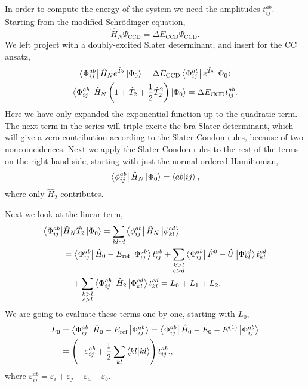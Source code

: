 In order to compute the energy of the system we need the amplitudes $t^{ab}_{ij}$.
Starting from the modified Schrödinger equation,
\begin{equation}
    \hat{H}_N \Psi_{\text{CCD}} = \Delta E_{\text{CCD}} \Psi_{\text{CCD}}.
\end{equation}
We left project with a doubly-excited Slater determinant, and insert for the CC ansatz,
\begin{gather}
    \bra{\Phi^{ab}_{ij}} \hat{H}_N e^{\hat{T}_2} \ket{\Phi_0} 
        = \Delta E_{\text{CCD}} \bra{\Phi^{ab}_{ij}} e^{\hat{T}_2} \ket{\Phi_0} \\
    \bra{\Phi^{ab}_{ij}} 
        \hat{H}_N \left(1 + \hat{T}_2 + \frac{1}{2}\hat{T}^2_2\right) \ket{\Phi_0}
        = \Delta E_{\text{CCD}} t^{ab}_{ij}. \label{eq:ccd_amplitude}
\end{gather}
Here we have only expanded the exponential function up to the quadratic term. The next
term in the series will triple-excite the bra Slater determinant, which will give a
zero-contribution according to the Slater-Condon rules, because of two noncoincidences. Next we apply the Slater-Condon rules to the rest of the terms on the right-hand side, starting with just the normal-ordered Hamiltonian,
\begin{equation}
    \bra{\phi^{ab}_{ij}} \hat{H}_N \ket{\Phi_0} = \bra{ab} \ket{ij},
\end{equation}
where only $\hat{H}_2$ contributes.

Next we look at the linear term,
\begin{equation}
    \begin{aligned}
    \bra{\Phi^{ab}_{ij}} &\hat{H}_N \hat{T}_2 \ket{\Phi_0} 
        = \sum_{klcd} \bra{\phi^{ab}_{ij}} \hat{H}_N \ket{\phi^{cd}_{kl}} \\
    &= \bra{\Phi^{ab}_{ij}} \hat{H}_0 - E_{\text{ref}} \ket{\Phi^{ab}_{ij}}t^{ab}_{ij}
        + \sum_{\substack{k>l \\ c>d}} 
            \bra{\Phi^{ab}_{ij}} \hat{F}^0 - \hat{U} \ket{\Phi^{cd}_{kl}} t^{cd}_{kl} \\
    &\quad + \sum_{\substack{k>l \\ c>l}} 
        \bra{\Phi^{ab}_{ij}} \hat{H}_2 \ket{\Phi^{cd}_{kl}} t^{cd}_{kl} 
        = L_0 + L_1 + L_2.
    \end{aligned}
\end{equation}
We are going to evaluate these terms one-by-one, starting with $L_0$,
\begin{equation}
    \begin{aligned}
        L_0 &= \bra{\Phi^{ab}_{ij}} \hat{H}_0 - E_{\text{ref}}\ket{\Phi^{ab}_{ij}}
            = \bra{\Phi^{ab}_{ij}} \hat{H}_0 - E_0 - E^{(1)}\ket{\Phi^{ab}_{ij}} \\
            &= \left(-\varepsilon^{ab}_{ij} + \frac{1}{2}\sum_{kl}\bra{kl} \ket{kl}\right) t^{ab}_{ij}.,
    \end{aligned}
\end{equation}
where $\varepsilon^{ab}_{ij} = \varepsilon_i + \varepsilon_j - \varepsilon_a - \varepsilon_b$.

